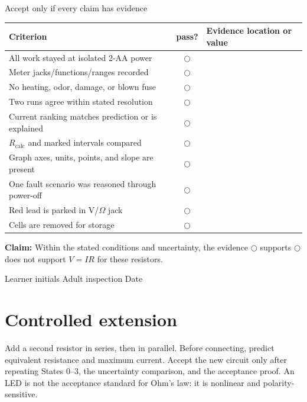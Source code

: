 \begin{gate}{Accept only if every claim has evidence}
\begin{tabularx}{\linewidth}{@{}p{.34\linewidth} c L@{}}
\toprule
Criterion & pass? & Evidence location or value\\
\midrule
All work stayed at isolated 2-AA power & \(\bigcirc\) & \\
Meter jacks/functions/ranges recorded & \(\bigcirc\) & \\
No heating, odor, damage, or blown fuse & \(\bigcirc\) & \\
Two runs agree within stated resolution & \(\bigcirc\) & \\
Current ranking matches prediction or is explained & \(\bigcirc\) & \\
\(R_\text{calc}\) and marked intervals compared & \(\bigcirc\) & \\
Graph axes, units, points, and slope are present & \(\bigcirc\) & \\
One fault scenario was reasoned through power-off & \(\bigcirc\) & \\
Red lead is parked in V/\(\Omega\) jack & \(\bigcirc\) & \\
Cells are removed for storage & \(\bigcirc\) & \\
\bottomrule
\end{tabularx}
\end{gate}

\textbf{Claim:} Within the stated conditions and uncertainty, the evidence
\(\bigcirc\) supports \(\bigcirc\) does not support \(V=IR\) for these resistors.

\medskip
Learner initials \blank{1.05in}\quad
Adult inspection \blank{1.05in}\quad
Date \blank{.8in}

\section{Controlled extension}

Add a second resistor in series, then in parallel. Before connecting, predict
equivalent resistance and maximum current. Accept the new circuit only after
repeating States 0--3, the uncertainty comparison, and the acceptance proof.
An LED is not the acceptance standard for Ohm's law: it is nonlinear and
polarity-sensitive.

\sourcefoot

